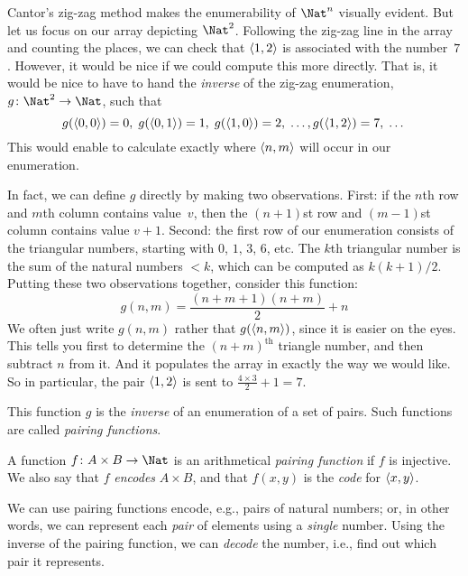 \documentclass[../../../include/open-logic-section]{subfiles}
\begin{document}

\begin{explain}
Cantor's zig-zag method makes the enumerability of $\Nat^n$ visually
evident. But let us focus on our array depicting $\Nat^2$. Following
the zig-zag line in the array and counting the places, we can check
that $\langle 1,2 \rangle$ is associated with the number~$7$. However, it would
be nice if we could compute this more directly. That is, it would be
nice to have to hand the \emph{inverse} of the zig-zag enumeration,
$g\colon \Nat^2 \to \Nat$, such that
\[
g(\langle 0,0 \rangle) = 0, \;
g(\langle 0,1 \rangle) = 1, \;
g(\langle 1,0 \rangle) = 2, \; \dots,  
g(\langle 1,2 \rangle) = 7, \; \dots
\]
This would enable to calculate exactly where $\langle n, m \rangle$ will occur
in our enumeration. 

In fact, we can define $g$ directly by making two observations. First:
if the $n$th row and $m$th column contains value~$v$, then the
$(n+1)$st row and $(m-1)$st column contains value $v + 1$. Second: the
first row of our enumeration consists of the triangular numbers,
starting with $0$, $1$, $3$, $6$, etc. The $k$th triangular number is
the sum of the natural numbers $< k$, which can be computed as
$k(k+1)/2$. Putting these two observations together, consider this
function:
\[
  g(n,m) = \frac{(n+m+1)(n+m)}{2} + n
\]
We often just write $g(n, m)$ rather that $g(\langle n, m \rangle)$, since it
is easier on the eyes. This tells you first to determine the
$(n+m)^\text{th}$ triangle number, and then subtract $n$ from it. And
it populates the array in exactly the way we would like. So in
particular, the pair $\langle 1, 2 \rangle$ is sent to $\frac{4 \times 3}{2} +
1 = 7$. 

This function $g$ is the \emph{inverse} of an enumeration of a set of
pairs. Such functions are called \emph{pairing functions}.
\end{explain}

\begin{defn} 
  A function $f\colon A \times B \to \Nat$ is an arithmetical
  \emph{pairing function} if $f$ is injective. We also say that $f$
  \emph{encodes} $A \times B$, and that $f(x,y)$ is the
  \emph{code} for $\langle x,y \rangle$.
\end{defn}

\begin{explain}
We can use pairing functions encode, e.g., pairs of natural numbers;
or, in other words, we can represent each \emph{pair} of elements
using a \emph{single} number. Using the inverse of the pairing
function, we can \emph{decode} the number, i.e., find out which
pair it represents.
\end{explain}
\end{document}
